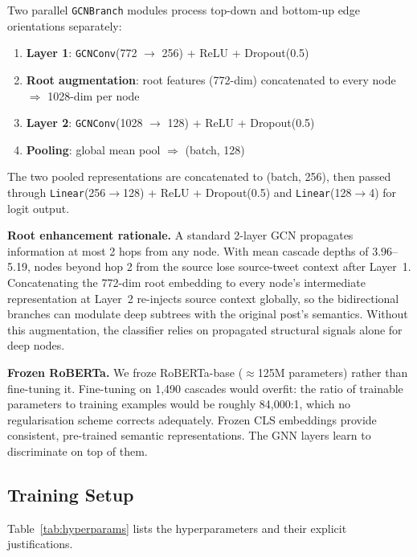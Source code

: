\documentclass[conference]{IEEEtran}
\begin{document}
Two parallel \texttt{GCNBranch} modules process top-down and bottom-up
edge orientations separately:

\begin{enumerate}
  \item \textbf{Layer 1}: \texttt{GCNConv}(772 $\to$ 256) + ReLU + Dropout(0.5)
  \item \textbf{Root augmentation}: root features (772-dim) concatenated to
    every node $\Rightarrow$ 1028-dim per node
  \item \textbf{Layer 2}: \texttt{GCNConv}(1028 $\to$ 128) + ReLU + Dropout(0.5)
  \item \textbf{Pooling}: global mean pool $\Rightarrow$ (batch, 128)
\end{enumerate}

The two pooled representations are concatenated to (batch, 256), then passed
through \texttt{Linear}(256$\to$128) + ReLU + Dropout(0.5) and
\texttt{Linear}(128$\to$4) for logit output.

\textbf{Root enhancement rationale.}
A standard 2-layer GCN propagates information at most 2 hops from any node.
With mean cascade depths of 3.96--5.19, nodes beyond hop 2 from the source
lose source-tweet context after Layer~1.
Concatenating the 772-dim root embedding to every node's intermediate
representation at Layer~2 re-injects source context globally, so the
bidirectional branches can modulate deep subtrees with the original post's
semantics.
Without this augmentation, the classifier relies on propagated structural
signals alone for deep nodes.

\textbf{Frozen RoBERTa.}
We froze RoBERTa-base (\(\approx\)125M parameters) rather than fine-tuning it.
Fine-tuning on 1,490 cascades would overfit: the ratio of trainable parameters
to training examples would be roughly 84,000:1, which no regularisation scheme
corrects adequately.
Frozen CLS embeddings provide consistent, pre-trained semantic representations.
The GNN layers learn to discriminate on top of them.

\subsection{Training Setup}

Table~\ref{tab:hyperparams} lists the hyperparameters and their explicit
justifications.
\end{document}
